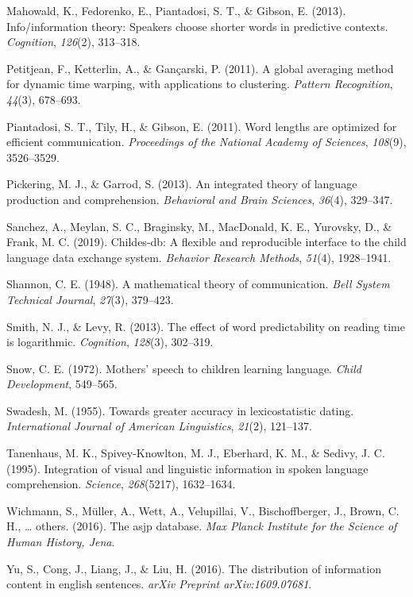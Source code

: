 \documentclass[10pt, letterpaper]{article}
\begin{document}
\leavevmode\hypertarget{ref-mahowald2013}{}%
Mahowald, K., Fedorenko, E., Piantadosi, S. T., \& Gibson, E. (2013).
Info/information theory: Speakers choose shorter words in predictive
contexts. \emph{Cognition}, \emph{126}(2), 313--318.

\leavevmode\hypertarget{ref-petitjean2011}{}%
Petitjean, F., Ketterlin, A., \& Gançarski, P. (2011). A global
averaging method for dynamic time warping, with applications to
clustering. \emph{Pattern Recognition}, \emph{44}(3), 678--693.

\leavevmode\hypertarget{ref-piantadosi2011}{}%
Piantadosi, S. T., Tily, H., \& Gibson, E. (2011). Word lengths are
optimized for efficient communication. \emph{Proceedings of the National
Academy of Sciences}, \emph{108}(9), 3526--3529.

\leavevmode\hypertarget{ref-pickering2013}{}%
Pickering, M. J., \& Garrod, S. (2013). An integrated theory of language
production and comprehension. \emph{Behavioral and Brain Sciences},
\emph{36}(4), 329--347.

\leavevmode\hypertarget{ref-sanchez2019}{}%
Sanchez, A., Meylan, S. C., Braginsky, M., MacDonald, K. E., Yurovsky,
D., \& Frank, M. C. (2019). Childes-db: A flexible and reproducible
interface to the child language data exchange system. \emph{Behavior
Research Methods}, \emph{51}(4), 1928--1941.

\leavevmode\hypertarget{ref-shannon1948}{}%
Shannon, C. E. (1948). A mathematical theory of communication.
\emph{Bell System Technical Journal}, \emph{27}(3), 379--423.

\leavevmode\hypertarget{ref-smith2013}{}%
Smith, N. J., \& Levy, R. (2013). The effect of word predictability on
reading time is logarithmic. \emph{Cognition}, \emph{128}(3), 302--319.

\leavevmode\hypertarget{ref-snow1972}{}%
Snow, C. E. (1972). Mothers' speech to children learning language.
\emph{Child Development}, 549--565.

\leavevmode\hypertarget{ref-swadesh1955}{}%
Swadesh, M. (1955). Towards greater accuracy in lexicostatistic dating.
\emph{International Journal of American Linguistics}, \emph{21}(2),
121--137.

\leavevmode\hypertarget{ref-tanenhaus1995}{}%
Tanenhaus, M. K., Spivey-Knowlton, M. J., Eberhard, K. M., \& Sedivy, J.
C. (1995). Integration of visual and linguistic information in spoken
language comprehension. \emph{Science}, \emph{268}(5217), 1632--1634.

\leavevmode\hypertarget{ref-wichmann2016}{}%
Wichmann, S., Müller, A., Wett, A., Velupillai, V., Bischoffberger, J.,
Brown, C. H., \ldots{} others. (2016). The asjp database. \emph{Max
Planck Institute for the Science of Human History, Jena}.

\leavevmode\hypertarget{ref-yu2016}{}%
Yu, S., Cong, J., Liang, J., \& Liu, H. (2016). The distribution of
information content in english sentences. \emph{arXiv Preprint
arXiv:1609.07681}.


\end{document}
